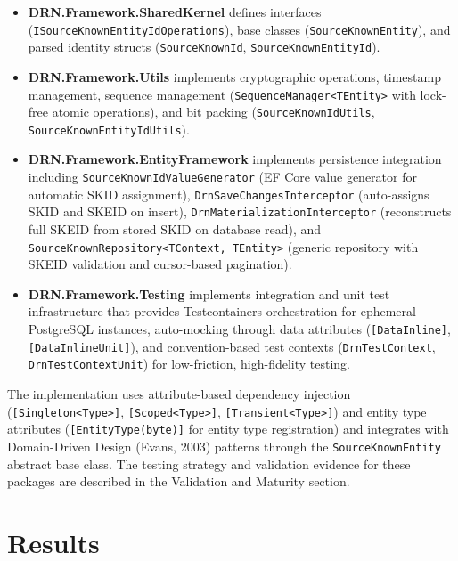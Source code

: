 \documentclass[fleqn,10pt]{wlpeerj}
\providecommand{\tightlist}{%
  \setlength{\itemsep}{0pt}\setlength{\parskip}{0pt}}
\begin{document}
\begin{itemize}
\tightlist
\item
  \textbf{DRN.Framework.SharedKernel} defines interfaces
  (\texttt{ISourceKnownEntityIdOperations}), base classes
  (\texttt{SourceKnownEntity}), and parsed identity structs
  (\texttt{SourceKnownId}, \texttt{SourceKnownEntityId}).
\item
  \textbf{DRN.Framework.Utils} implements cryptographic operations,
  timestamp management, sequence management
  (\texttt{SequenceManager\textless{}TEntity\textgreater{}} with
  lock-free atomic operations), and bit packing
  (\texttt{SourceKnownIdUtils}, \texttt{SourceKnownEntityIdUtils}).
\item
  \textbf{DRN.Framework.EntityFramework} implements persistence
  integration including \texttt{SourceKnownIdValueGenerator} (EF Core
  value generator for automatic SKID assignment),
  \texttt{DrnSaveChangesInterceptor} (auto-assigns SKID and SKEID on
  insert), \texttt{DrnMaterializationInterceptor} (reconstructs full
  SKEID from stored SKID on database read), and
  \texttt{SourceKnownRepository\textless{}TContext,\ TEntity\textgreater{}}
  (generic repository with SKEID validation and cursor-based
  pagination).
\item
  \textbf{DRN.Framework.Testing} implements integration and unit test
  infrastructure that provides Testcontainers orchestration for
  ephemeral PostgreSQL instances, auto-mocking through data attributes
  (\texttt{{[}DataInline{]}}, \texttt{{[}DataInlineUnit{]}}), and
  convention-based test contexts (\texttt{DrnTestContext},
  \texttt{DrnTestContextUnit}) for low-friction, high-fidelity testing.
\end{itemize}

The implementation uses attribute-based dependency injection
(\texttt{{[}Singleton\textless{}Type\textgreater{}{]}},
\texttt{{[}Scoped\textless{}Type\textgreater{}{]}},
\texttt{{[}Transient\textless{}Type\textgreater{}{]}}) and entity type
attributes (\texttt{{[}EntityType(byte){]}} for entity type
registration) and integrates with Domain-Driven Design (Evans, 2003)
patterns through the \texttt{SourceKnownEntity} abstract base class. The
testing strategy and validation evidence for these packages are
described in the Validation and Maturity section.

\section{Results}\label{results}
\end{document}
